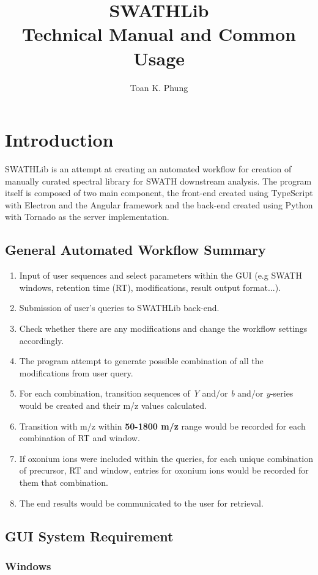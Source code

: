 \documentclass[10pt,a4paper]{memoir}
\title{%
SWATHLib \\
\large Technical Manual and Common Usage}
\author{Toan K. Phung}
\begin{document}
\frontmatter
\maketitle
\clearpage
\tableofcontents
\mainmatter
\chapter{Introduction}

SWATHLib is an attempt at creating an automated workflow for creation of manually curated spectral library for SWATH downstream analysis. The program itself is composed of two main component, the front-end created using TypeScript with Electron and the Angular framework and the back-end created using Python with Tornado as the server implementation.
\section{General Automated Workflow Summary}
\begin{enumerate}
	\item Input of user sequences and select parameters within the GUI (e.g SWATH windows, retention time (RT), modifications, result output format...).
	\item Submission of user's queries to SWATHLib back-end.
	\item Check whether there are any modifications and change the workflow settings accordingly.
	\item The program attempt to generate possible combination of all the modifications from user query.
	\item For each combination, transition sequences of \emph{Y}  and/or \emph{b} and/or \emph{y}-series would be created and their m/z values calculated.
	\item Transition with m/z within \textbf{50-1800 m/z} range would be recorded for each combination of RT and window.
	\item If oxonium ions were included within the queries, for each unique combination of precursor, RT and window, entries for oxonium ions would be recorded for them that combination.
	\item The end results would be communicated to the user for retrieval.
\end{enumerate}
\section{GUI System Requirement}
\subsection{Windows}
\end{document}
